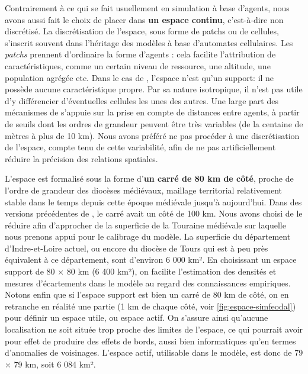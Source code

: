 Contrairement à ce qui se fait usuellement en simulation à base d'agents, nous avons aussi fait le choix de placer \simfeodal{} dans \textbf{un espace continu}, c'est-à-dire non discrétisé.
La discrétisation de l'espace, sous forme de \og patchs\fg{} ou de \og cellules\fg{}, s'inscrit souvent dans l'héritage des modèles à base d'automates cellulaires.
Les \textit{patchs} prennent d'ordinaire la forme d'agents : cela facilite l'attribution de caractéristiques, comme un certain niveau de ressource, une altitude, une population agrégée etc.
Dans le cas de \simfeodal{}, l'espace n'est qu'un support: il ne possède aucune caractéristique propre.
Par sa nature isotropique, il n'est pas utile d'y différencier d'éventuelles cellules les unes des autres.
Une large part des mécanismes de \simfeodal{} s'appuie sur la prise en compte de distances entre agents, à partir de seuils dont les ordres de grandeur peuvent être très variables (de la centaine de mètres à plus de 10 km).
Nous avons préféré ne pas procéder à une discrétisation de l'espace, compte tenu de cette variabilité, afin de ne pas artificiellement réduire la précision des relations spatiales.

L'espace est formalisé sous la forme d'\textbf{un carré de 80 km de côté}, proche de l'ordre de grandeur des diocèses médiévaux, maillage territorial relativement stable dans le temps depuis cette époque médiévale jusqu'à aujourd'hui.
Dans des versions précédentes de \simfeodal{}, le carré avait un côté de 100 km. Nous avons choisi de le réduire afin d'approcher de la superficie de la Touraine médiévale sur laquelle nous prenons appui pour le calibrage du modèle. 
La superficie du département d'Indre-et-Loire actuel, ou encore du diocèse de Tours qui est à peu près équivalent à ce département, sont d'environ 6 000 km².
En choisissant un espace support de 80 $\times$ 80 km (6 400 km²), on facilite l'estimation des densités et mesures d'écartements dans le modèle au regard des connaissances empiriques.
Notons enfin que si l'espace support est bien un carré de 80 km de côté, on en retranche en réalité une partie (1 km de chaque côté, voir \cref{fig:espace-simfeodal}) pour définir un espace utile, ou \og espace actif\fg{}.
On s'assure ainsi qu'aucune localisation ne soit située trop proche des limites de l'espace, ce qui pourrait avoir pour effet de produire des \og effets de bords\fg{}, aussi bien informatiques qu'en termes d'anomalies de voisinages.
L'espace actif, utilisable dans le modèle, est donc de 79 $\times$ 79 km, soit 6 084 km².

